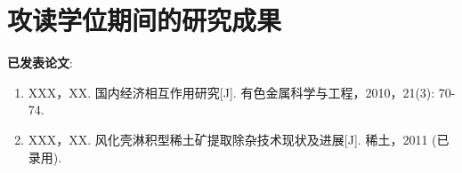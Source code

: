 \renewcommand{\headrulewidth}{0.5pt} %
\section*{\heiti {} \textbf{攻读学位期间的研究成果}}
\songti {} \textbf{已发表论文}:
\par 
\begin{enumerate}
\songti {}
\item XXX，XX. 国内经济相互作用研究[J]. 有色金属科学与工程，2010，21(3): 70-74.

\item XXX，XX. 风化壳淋积型稀土矿提取除杂技术现状及进展[J]. 稀土，2011 (已录用).

\end{enumerate}

